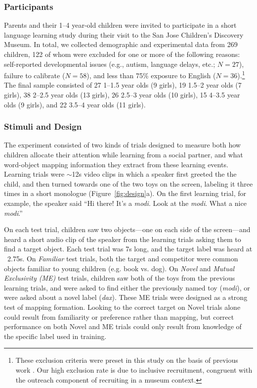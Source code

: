\documentclass[man,floatsintext]{apa6}
\begin{document}
\subsubsection{Participants}

Parents and their 1--4 year-old children were invited to participate in a short language learning study during their visit to the San Jose Children's Discovery Museum. In total, we collected demographic and experimental data from 269 children, 122 of whom were excluded for one or more of the following reasons: self-reported developmental issues (e.g., autism, language delays, etc.; $N= 27$), failure to calibrate ($N=58$), and less than 75\% exposure to English ($N=36$).\footnote{These exclusion criteria were preset in this study on the basis of previous work \cite{Yurovsky2013c}. Our high exclusion rate is due to inclusive recruitment, congruent with the outreach component of recruiting in a museum context.} The final sample consisted of 27 1--1.5 year olds (9 girls), 19 1.5--2 year olds (7 girls), 38 2--2.5 year olds (13 girls), 26 2.5--3 year olds (10 girls), 15 4--3.5 year olds (9 girls), and 22 3.5--4 year olds (11 girls).

\subsubsection{Stimuli and Design}

The experiment consisted of two kinds of trials designed to measure both how children allocate their attention while learning from a social partner, and what word-object mapping information they extract from these learning events. Learning trials were $\sim$12s video clips in which a speaker first greeted the the child, and then turned towards one of the two toys on the screen, labeling it three times in a short monologue (Figure~\ref{fig:design}a). On the first learning trial, for example, the speaker said ``Hi there! It's a \emph{modi}. Look at the \emph{modi}. What a nice \emph{modi}.''

On each test trial, children saw two objects---one on each side of the screen---and heard a short audio clip of the speaker from the learning trials asking them to find a target object. Each test trial was 7s long, and the target label was heard at ~2.75s. On \emph{Familiar} test trials, both the target and competitor were common objects familiar to young children (e.g. book vs. dog). On \emph{Novel} and  \emph{Mutual Exclusivity (ME)} test trials, children saw both of the toys from the previous learning trials, and were asked to find either the previously named toy (\emph{modi}), or were asked about a novel label (\emph{dax}). These ME trials were designed as a strong test of mapping formation. Looking to the correct target on Novel trials alone could result from familiarity or preference rather than mapping, but correct performance on both Novel and ME trials could only result from knowledge of the specific label used in training.
\end{document}
